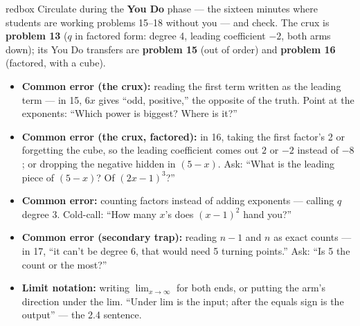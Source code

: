 \documentclass[10pt]{article}
\begin{document}
\begin{skillbox}{redbox}
Circulate during the \textbf{You Do} phase --- the sixteen minutes where students are working
problems 15--18 without you --- and check. The crux is \textbf{problem 13} ($q$ in factored
form: degree 4, leading coefficient $-2$, both arms down); its You Do transfers are
\textbf{problem 15} (out of order) and \textbf{problem 16} (factored, with a cube).
\begin{itemize}
  \item \textbf{Common error (the crux):} reading the first term written as the leading term
        --- in 15, $6x$ gives ``odd, positive,'' the opposite of the truth. Point at the
        exponents: ``Which power is biggest? Where is it?''
  \item \textbf{Common error (the crux, factored):} in 16, taking the first factor's 2 or
        forgetting the cube, so the leading coefficient comes out $2$ or $-2$ instead of $-8$;
        or dropping the negative hidden in $(5 - x)$. Ask: ``What is the leading piece of
        $(5 - x)$? Of $(2x - 1)^3$?''
  \item \textbf{Common error:} counting factors instead of adding exponents --- calling $q$
        degree 3. Cold-call: ``How many $x$'s does $(x - 1)^2$ hand you?''
  \item \textbf{Common error (secondary trap):} reading $n - 1$ and $n$ as exact counts ---
        in 17, ``it can't be degree 6, that would need 5 turning points.'' Ask: ``Is 5 the
        count or the most?''
  \item \textbf{Limit notation:} writing $\lim_{x \to \infty}$ for both ends, or putting the
        arm's direction under the lim. ``Under lim is the input; after the equals sign is the
        output'' --- the 2.4 sentence.
\end{itemize}
\end{skillbox}
\end{document}
